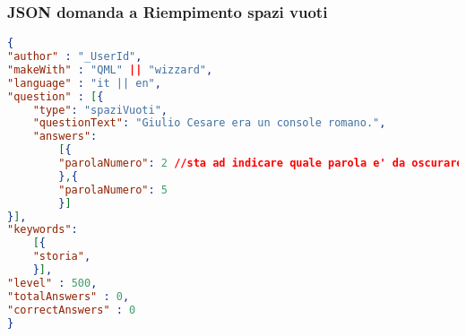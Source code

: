 \subsubsection{JSON domanda a Riempimento spazi vuoti}
\begin{lstlisting}[language=json,firstnumber=1]
{
"author" : "_UserId",
"makeWith" : "QML" || "wizzard",
"language" : "it || en",
"question" : [{
	"type": "spaziVuoti",
	"questionText": "Giulio Cesare era un console romano.",
	"answers":
		[{
		"parolaNumero": 2 //sta ad indicare quale parola e' da oscurare. In questo caso la numero 2
		},{
		"parolaNumero": 5
		}]
}],
"keywords":
	[{
	"storia",
	}],
"level" : 500,
"totalAnswers" : 0,
"correctAnswers" : 0
}
\end{lstlisting}
